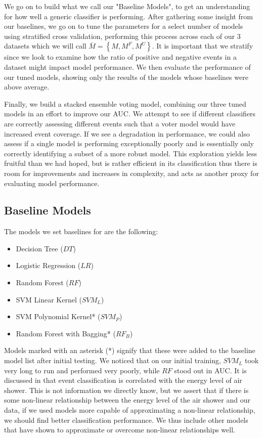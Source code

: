 \documentclass[12pt, a4paper]{article} %
\begin{document}
We go on to build what we call our "Baseline Models", to get an understanding for how well a generic classifier is performing. After gathering some insight from our baselines, we go on to tune the parameters for a select number of models using stratified cross validation, performing this process across each of our 3 datasets which we will call $\bar{M} = \left\{ M, M^{F}, M^{U} \right\}$. It is important that we stratify since we look to examine how the ratio of positive and negative events in a dataset might impact model performance.  We then evaluate the performance of our tuned models, showing only the results of the models whose baselines were above average. 

Finally, we build a stacked ensemble voting model, combining our three tuned models in an effort to improve our AUC. We attempt to see if different classifiers are correctly assessing different events such that a voter model would have increased event coverage. If we see a degradation in performance, we could also assess if a single model is performing exceptionally poorly and is essentially only correctly identifying a subset of a more robust model. This exploration yields less fruitful than we had hoped, but is rather efficient in its classification thus there is room for improvements and increases in complexity, and acts as another proxy for evaluating model performance. 


\subsection{Baseline Models}

The models we set baselines for are the following:

\begin{itemize}
	\item Decision Tree ($DT$)
	\item Logistic Regression ($LR$)
	\item Random Forest ($RF$)
	\item SVM Linear Kernel ($SVM_L$)
	\item SVM Polynomial Kernel* ($SVM_P$)
	\item Random Forest with Bagging* ($RF_B$)
\end{itemize}

Models marked with an asterisk (*) signify that these were added to the baseline model list after initial testing. We noticed that on our initial training, $SVM_L$ took very long to run and performed very poorly, while $RF$ stood out in AUC. It is discussed in \cite{CaseStudy} that event classification is correlated with the energy level of air shower. This is not information we directly know, but we assert that if there is some non-linear relationship between the energy level of the air shower and our data, if we used models more capable of approximating a non-linear relationship, we should find better classification performance. We thus include other models that have shown to approximate or overcome non-linear relationships well.
\end{document}
